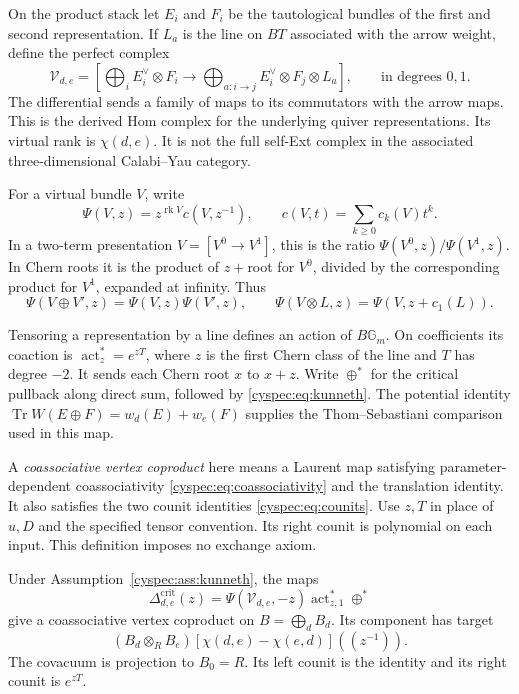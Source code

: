 On the product stack let $E_i$ and $F_i$ be the tautological bundles
of the first and second representation. If $L_a$ is the line on
$BT$ associated with the arrow weight, define the perfect complex
\begin{equation}\label{cyspec:eq:ambient-ext}
 \mathcal V_{d,e}=
 \left[\bigoplus_i E_i^\vee\otimes F_i
 \longrightarrow
 \bigoplus_{a:i\to j}E_i^\vee\otimes F_j\otimes L_a\right],
 \qquad\text{in degrees }0,1.
\end{equation}
The differential sends a family of maps to its commutators with
the arrow maps. This is the derived Hom complex for the underlying
quiver representations. Its virtual rank is $\chi(d,e)$.
It is not the full self-Ext complex in the associated
three-dimensional Calabi--Yau category.

For a virtual bundle $V$, write
\begin{equation}\label{cyspec:eq:characteristic-series}
 \Psi(V,z)=z^{\operatorname{rk}V}c(V,z^{-1}),
 \qquad c(V,t)=\sum_{k\geq0}c_k(V)t^k.
\end{equation}
In a two-term presentation $V=[V^0\to V^1]$, this is the ratio
$\Psi(V^0,z)/\Psi(V^1,z)$. In Chern roots it is the product of
$z+$root for $V^0$, divided by the corresponding product for $V^1$,
expanded at infinity. Thus
\[
 \Psi(V\oplus V',z)=\Psi(V,z)\Psi(V',z),\qquad
 \Psi(V\otimes L,z)=\Psi(V,z+c_1(L)).
\]

Tensoring a representation by a line defines an action of
$B\mathbb G_m$. On coefficients its coaction is
$\operatorname{act}_z^*=e^{zT}$, where $z$ is the first Chern class
of the line and $T$ has degree $-2$.
It sends each Chern root $x$ to $x+z$.
Write $\oplus^*$ for the critical pullback along direct sum,
followed by \eqref{cyspec:eq:kunneth}. The potential identity
$\operatorname{Tr}W(E\oplus F)=w_d(E)+w_e(F)$ supplies the
Thom--Sebastiani comparison used in this map.

A \emph{coassociative vertex coproduct} here means a Laurent map
satisfying parameter-dependent coassociativity
\eqref{cyspec:eq:coassociativity} and the translation identity.
It also satisfies the two counit identities \eqref{cyspec:eq:counits}.
Use $z,T$ in place of $u,D$ and the specified tensor convention.
Its right counit is polynomial on each input.
This definition imposes no exchange axiom.

\begin{theorem}
\label{cyspec:thm:critical-coproduct}
Under Assumption~\ref{cyspec:ass:kunneth}, the maps
\begin{equation}\label{cyspec:eq:critical-coproduct}
 \Delta^{\mathrm{crit}}_{d,e}(z)
 =\Psi(\mathcal V_{d,e},-z)\operatorname{act}_{z,1}^*\oplus^*
\end{equation}
give a coassociative vertex coproduct on $B=\bigoplus_d B_d$.
Its component has target
\[
 (B_d\otimes_R B_e)[\chi(d,e)-\chi(e,d)]((z^{-1})).
\]
The covacuum is projection to $B_0=R$. Its left counit is the
identity and its right counit is $e^{zT}$.
\end{theorem}

